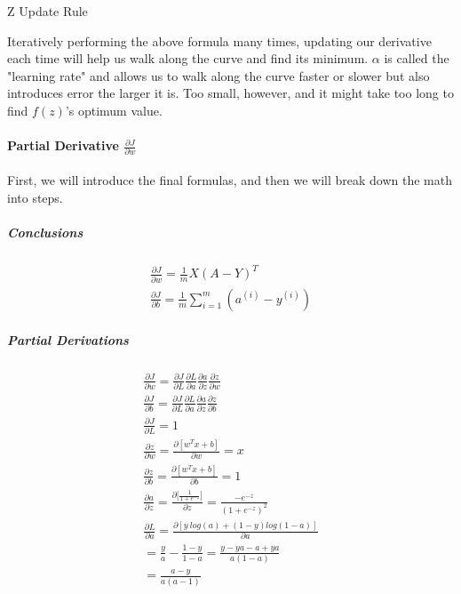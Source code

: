\documentclass{article}
\newcommand{\myparagraph}[1]{\paragraph{#1}\mbox{}}
\newcommand{\mysubparagraph}[1]{\subparagraph{#1}\mbox{}}
\begin{document}
\begin{algorithm}[h]
\caption{Z Update Rule}
\label{alg:z_update_rule}
\end{algorithm}

Iteratively performing the above formula many times, updating our derivative each time will help us walk along the curve and find its minimum.  $\alpha$ is called the "learning rate" and allows us to walk along the curve faster or slower but also introduces error the larger it is.  Too small, however, and it might take too long to find $f(z)$'s optimum value.

\myparagraph{Partial Derivative $\frac{\partial{J}}{\partial{w}}$}

First, we will introduce the final formulas, and then we will break down the math into steps.

\mysubparagraph{Conclusions}

\begin{gather}
\frac{\partial{J}}{\partial{w}} = \frac{1}{m}X(A-Y)^{T} \\
%
\frac{\partial{J}}{\partial{b}} = \frac{1}{m} \sum_{i=1}^{m}(a^{(i)} - y^{(i)})
\end{gather}

\mysubparagraph{Partial Derivations}

\begin{gather}
\frac{\partial{J}}{\partial{w}} = \frac{\partial{J}}{\partial{L}}\frac{\partial{L}}{\partial{a}}\frac{\partial{a}}{\partial{z}}\frac{\partial{z}}{\partial{w}} \label{eqn:dJ_dw} \\
%
\frac{\partial{J}}{\partial{b}} = \frac{\partial{J}}{\partial{L}}\frac{\partial{L}}{\partial{a}}\frac{\partial{a}}{\partial{z}}\frac{\partial{z}}{\partial{b}} \label{eqn:dJ_db} \\
%
\frac{\partial{J}}{\partial{L}} = 1 \\
%
\frac{\partial{z}}{\partial{w}} = \frac{\partial{[w^T x + b]}}{\partial{w}} = x \\
%
\frac{\partial{z}}{\partial{b}} = \frac{\partial{[w^{T} x + b]}}{\partial{b}} = 1 \\
%
\frac{\partial{a}}{\partial{z}} = \frac{\partial{[\frac{1}{1 + e^{-z}}}]}{\partial{z}} = \frac{-e^{-z}}{(1+e^{-z})^{2}} \\
%
\frac{\partial{L}}{\partial{a}} = \frac{\partial{[y\ log(a) + (1-y) log (1-a)]}}{\partial{a}} \\
= \frac{y}{a} - \frac{1-y}{1-a} = \frac{y-ya-a+ya}{a(1-a)} \\
= \frac{a-y}{a(a-1)}
\end{gather}
\end{document}
